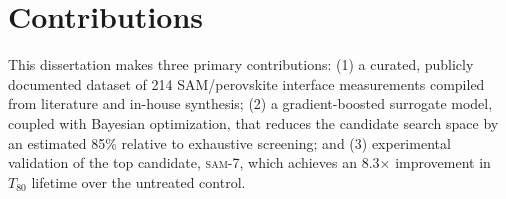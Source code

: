 \section{Contributions}

This dissertation makes three primary contributions: (1) a curated,
publicly documented dataset of 214 SAM/perovskite interface measurements
compiled from literature and in-house synthesis; (2) a gradient-boosted
surrogate model, coupled with Bayesian optimization, that reduces the
candidate search space by an estimated 85\% relative to exhaustive
screening; and (3) experimental validation of the top candidate,
\textsc{sam-7}, which achieves an 8.3$\times$ improvement in $T_{80}$
lifetime over the untreated control.
